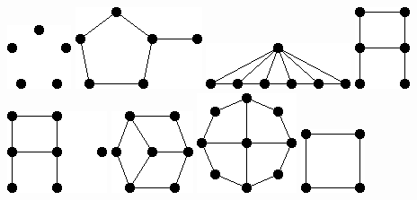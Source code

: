\documentclass[11pt,paper=b5,footinclude,headinclude]{scrbook} %
\theoremstyle{remark}
\theoremstyle{definition} %
\theoremstyle{theorem} %
\begin{document}
\includegraphics[scale=0.5,frame]{smallGraphs/g_5K1.png}     
\includegraphics[scale=0.5,frame]{smallGraphs/g_5pan.png}     
\includegraphics[scale=0.5,frame]{smallGraphs/g_6fan.png}     
\includegraphics[scale=0.5,frame]{smallGraphs/g_A.png}     
\includegraphics[scale=0.5,frame]{smallGraphs/g_AUK1.png}     
\includegraphics[scale=0.5,frame]{smallGraphs/g_BW3.png}     
\includegraphics[scale=0.5,frame]{smallGraphs/g_BW4.png}     
\includegraphics[scale=0.5,frame]{smallGraphs/g_C4.png}     
\end{document}
